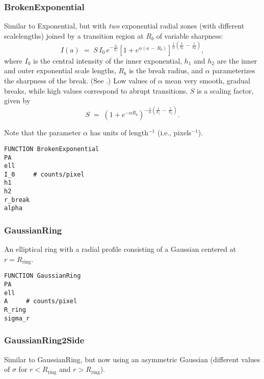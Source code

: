 \documentclass[10pt,a4paper,article]{memoir}
\begin{document}
\subsubsection{BrokenExponential}\label{sec:brokenexp}

Similar to Exponential, but with \textit{two}
exponential radial zones (with different scalelengths) joined by a transition region
at $R_{b}$ of variable sharpness:
\begin{equation}
	I(a) \; = \; S \, I_{0} \, e^{-\frac{a}{h_{1}}} [1 + e^{\alpha(a \, - \,
	R_{b})}]^{\frac{1}{\alpha} (\frac{1}{h_{1}} \, - \, \frac{1}{h_{2}})},
\end{equation}
where $I_{0}$ is the central intensity of the inner exponential, $h_{1}$ and
$h_{2}$ are the inner and outer exponential scale lengths, $R_{b}$ is the break radius, and
$\alpha$ parameterizes the sharpness of the break.  (See \citet{erwin08}.) Low values of $\alpha$
mean very smooth, gradual breaks, while high values correspond to abrupt
transitions.  $S$ is a scaling factor, given by
\begin{equation}
  S \; = \; (1 + e^{-\alpha R_{b}})^{-\frac{1}{\alpha} (\frac{1}{h_{1}} \, - 
  \, \frac{1}{h_{2}})}.
\end{equation}

Note that the parameter $\alpha$ has units of length$^{-1}$ (i.e., pixels$^{-1}$).

\begin{verbatim}
FUNCTION BrokenExponential
PA
ell
I_0     # counts/pixel
h1
h2
r_break
alpha
\end{verbatim}


\subsubsection{GaussianRing}

An elliptical ring with a radial profile consisting of a Gaussian
centered at $r = R_{\mathrm{ring}}$.

\begin{verbatim}
FUNCTION GaussianRing
PA
ell
A     # counts/pixel
R_ring
sigma_r
\end{verbatim}


\subsubsection{GaussianRing2Side}

Similar to GaussianRing, but now using an asymmetric Gaussian (different
values of $\sigma$ for $r < R_{\mathrm{ring}}$ and $r > R_{\mathrm{ring}}$).
\end{document}
